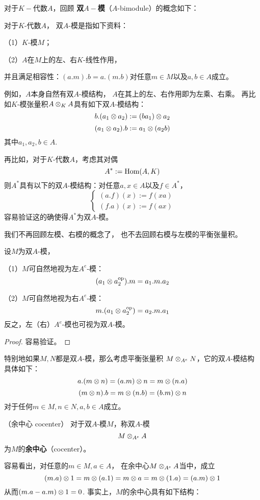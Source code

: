 对于$K-$代数$A$，回顾
\textbf{双$A-$模}（$A$-bimodule）的概念如下：

\begin{definition}对于$K$-代数$A$，
双$A$-模是指如下资料：

（1）$K$-模$M$；

（2）$A$在$M$上的左、右$K$-线性作用，

并且满足相容性：$(a.m).b=a.(m.b)$对任意$m\in M$以及$a,b\in A$成立。
\end{definition}

例如，$A$本身自然有双$A$-模结构，
$A$在其上的左、右作用即为左乘、右乘。
再比如$K$-模张量积$A\otimes_KA$具有如下双$A$-模结构：
$$b.(a_1\otimes a_2):=(ba_1)\otimes a_2$$
$$(a_1\otimes a_2).b:=a_1\otimes(a_2b)$$
其中$a_1,a_2,b\in A$.

再比如，对于$K$-代数$A$，考虑其对偶
$$A^*:=\operatorname{Hom}(A,K)$$
则$A^*$具有以下的双$A$-模结构：对任意$a,x\in A$以及$f\in A^*$，
$$
  \left\{
    \begin{array}{l}
      (a.f)(x):=f(xa)\\
      (f.a)(x):=f(ax)
    \end{array}
  \right.
$$
容易验证这的确使得$A^*$为双$A$-模。\vs

我们不再回顾左模、右模的概念了，
也不去回顾右模与左模的平衡张量积。

\begin{prop}设$M$为双$A$-模，

（1）$M$可自然地视为左$A^e$-模：
$$(a_1\otimes a_2^{\text{op}}).m=a_1.m.a_2$$

（2）$M$可自然地视为右$A^e$-模：
$$m.(a_1\otimes a_2^{\text{op}})=a_2.m.a_1$$
反之，左（右）$A^e$-模也可视为双$A$-模。
\end{prop}

\begin{proof}
容易验证。
\end{proof}

特别地如果$M,N$都是双$A$-模，那么考虑平衡张量积
$M\otimes_{A^e}N$，它的双$A$-模结构具体如下：
$$a.(m\otimes n)=(a.m)\otimes n=m\otimes(n.a)$$
$$(m\otimes n).b=m\otimes (n.b)=(b.m)\otimes n$$
对于任何$m\in M,n\in N,a,b\in A$成立。

\begin{definition}（余中心 cocenter）
对于双$A$-模$M$，称双$A$-模
$$M\otimes_{A^e}A$$
为$M$的\textbf{余中心}（cocenter）。
\end{definition}

容易看出，对任意的$m\in M,a\in A$，
在余中心$M\otimes_{A^e}A$当中，成立
$$(m.a)\otimes 1=m\otimes(a.1)=m\otimes a=m\otimes(1.a)=(a.m)\otimes 1$$
从而$(m.a-a.m)\otimes 1=0$.
事实上，$M$的余中心具有如下结构：

